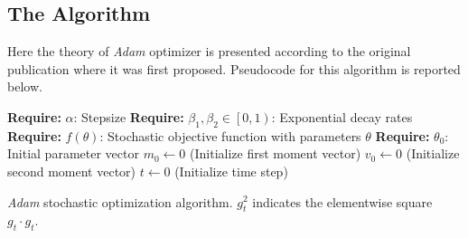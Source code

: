 \documentclass[%
    corpo=11pt,
    twoside,
    stile=classica,
    oldstyle,
    autoretitolo,
    tipotesi=magistrale,
    greek,
    evenboxes,
    english
]{toptesi}
\begin{document}
\subsection{The Algorithm}
Here the theory of \textit{Adam} optimizer is presented according to the original publication  where it was first proposed. Pseudocode for this algorithm is reported below. \\
\begin{algorithm}[H]
\label{algo:adam}
\SetAlgoLined
 \textbf{Require:} $\alpha$: Stepsize\;
 \textbf{Require:} $\beta_1,\beta_2 \in \left[0,1\right)$: Exponential decay rates\;
 \textbf{Require:} $f(\theta)$: Stochastic objective function with parameters $\theta$\;
 \textbf{Require:} $\theta_0$: Initial parameter vector\;
 $m_0 \leftarrow 0$ (Initialize first moment vector)\;
 $v_0 \leftarrow 0$ (Initialize second moment vector)\;
 $t \leftarrow 0$ (Initialize time step)\;
 \caption{\textit{Adam} stochastic optimization algorithm. $g_t^{2}$ indicates the elementwise square $g_t \cdot g_t$.}
\end{algorithm}
\end{document}
